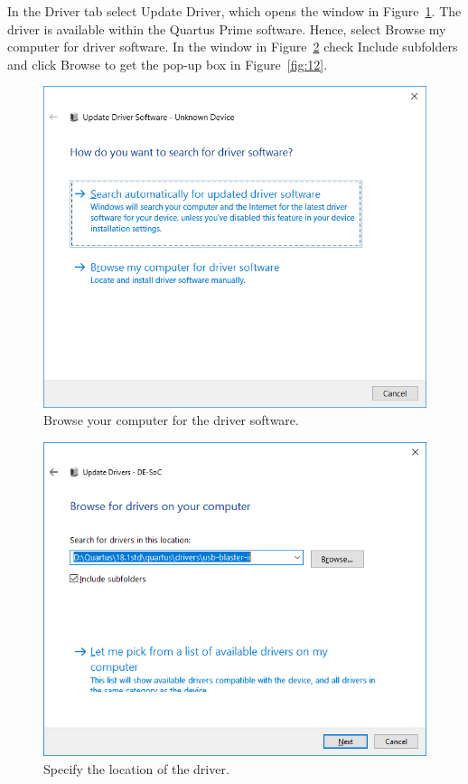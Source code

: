 \documentclass[11pt, twoside, pdftex]{article}
\begin{document}
In the {\sf Driver} tab select {\sf Update Driver}, which opens the window in Figure~\ref{fig:10}.
The driver is available within the Quartus Prime software.  Hence, select 
{\sf Browse my computer for driver software}.  In the window in Figure~\ref{fig:11} 
check {\sf Include subfolders} and click {\sf Browse} to get the pop-up box 
in Figure~\ref{fig:12}.

\begin{figure}[H]
	\begin{center}
		\includegraphics[scale=0.65]{figures/figure10.png}
		\caption{Browse your computer for the driver software.} 
		\label{fig:10}
	\end{center}
\end{figure}

\begin{figure}[H]
	\begin{center}
		\includegraphics[scale=0.65]{figures/figure11.png}
		\caption{Specify the location of the driver.} 
		\label{fig:11}
	\end{center}
\end{figure}
\end{document}
